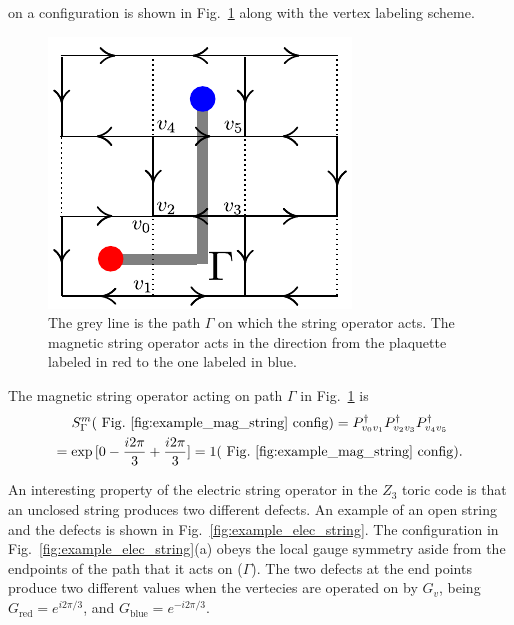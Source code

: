 \documentclass[twocolumn,prb,aps,floatfix,superscriptaddress]{revtex4-1}
\begin{document}
            on a configuration is shown in Fig.~\ref{fig:example_mag_string} along with the vertex labeling
            scheme.
            \begin{figure}[htpb]
                \centering
                \includegraphics[width=0.8\linewidth]{example_mag_string.pdf}
                \caption{The grey line is the path $\Gamma$ on which the string operator acts. The magnetic
                    string operator acts in the 
                    direction from the plaquette labeled in red to the one labeled in blue.}
                \label{fig:example_mag_string}
            \end{figure}
            The magnetic string operator acting on path $\Gamma$ in Fig.~\ref{fig:example_mag_string} is
            \begin{multline}
                S^m_{\Gamma} (\mathrm{~Fig.~\ref{fig:example_mag_string}~config})
                = P_{v_0v_1}^\dagger P_{v_2v_3}^\dagger P_{v_4v_5}^\dagger
                \\
                = \exp{[0 - \frac{i2\pi}{3} + \frac{i2\pi}{3} ]} 
                = 1 (\mathrm{~Fig.~\ref{fig:example_mag_string}~config})
                .
            \end{multline}

            An interesting property of the electric string operator in the $Z_3$ toric code is
            that an unclosed string produces two different defects. 
            An example of an open string and the defects is shown in Fig.~\ref{fig:example_elec_string}. The
            configuration in Fig.~\ref{fig:example_elec_string}(a) obeys the local gauge symmetry
            aside from the endpoints of the path that it acts on ($\Gamma$). The two defects at the
            end points produce two different values when the vertecies are operated on by $G_v$, being
            $G_{\mathrm{red}} = e^{i2\pi /3}$, and $G_{\mathrm{blue}} = e^{-i2\pi /3}$. 
\end{document}
